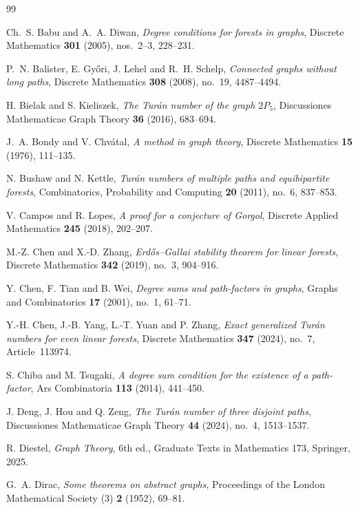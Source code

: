 \documentclass[10pt]{article}
\theoremstyle{compactplain}
\theoremstyle{remark}\newtheorem{remark}[theorem]{Remark}
\begin{document}
\small
\begin{thebibliography}{99}
\setlength{\itemsep}{-1pt}

Ch.~S. Babu and A.~A. Diwan,
\emph{Degree conditions for forests in graphs},
Discrete Mathematics \textbf{301} (2005), nos.~2--3, 228--231.

P.~N. Balister, E. Gy\H{o}ri, J. Lehel and R.~H. Schelp,
\emph{Connected graphs without long paths},
Discrete Mathematics \textbf{308} (2008), no.~19, 4487--4494.

H. Bielak and S. Kieliszek,
\emph{The Tur\'an number of the graph $2P_5$},
Discussiones Mathematicae Graph Theory \textbf{36} (2016), 683--694.

J.~A. Bondy and V. Chv\'atal,
\emph{A method in graph theory},
Discrete Mathematics \textbf{15} (1976), 111--135.

N. Bushaw and N. Kettle,
\emph{Tur\'an numbers of multiple paths and equibipartite forests},
Combinatorics, Probability and Computing \textbf{20} (2011), no.~6,
837--853.

V. Campos and R. Lopes,
\emph{A proof for a conjecture of Gorgol},
Discrete Applied Mathematics \textbf{245} (2018), 202--207.

M.-Z. Chen and X.-D. Zhang,
\emph{Erd\H{o}s--Gallai stability theorem for linear forests},
Discrete Mathematics \textbf{342} (2019), no.~3, 904--916.

Y. Chen, F. Tian and B. Wei,
\emph{Degree sums and path-factors in graphs},
Graphs and Combinatorics \textbf{17} (2001), no.~1, 61--71.

Y.-H. Chen, J.-B. Yang, L.-T. Yuan and P. Zhang,
\emph{Exact generalized Tur\'an numbers for even linear forests},
Discrete Mathematics \textbf{347} (2024), no.~7, Article~113974.

S. Chiba and M. Tsugaki,
\emph{A degree sum condition for the existence of a path-factor},
Ars Combinatoria \textbf{113} (2014), 441--450.

J. Deng, J. Hou and Q. Zeng,
\emph{The Tur\'an number of three disjoint paths},
Discussiones Mathematicae Graph Theory \textbf{44} (2024), no.~4,
1513--1537.

R. Diestel,
\emph{Graph Theory}, 6th ed.,
Graduate Texts in Mathematics 173, Springer, 2025.

G.~A. Dirac,
\emph{Some theorems on abstract graphs},
Proceedings of the London Mathematical Society (3) \textbf{2} (1952),
69--81.


\end{thebibliography}
\end{document}
